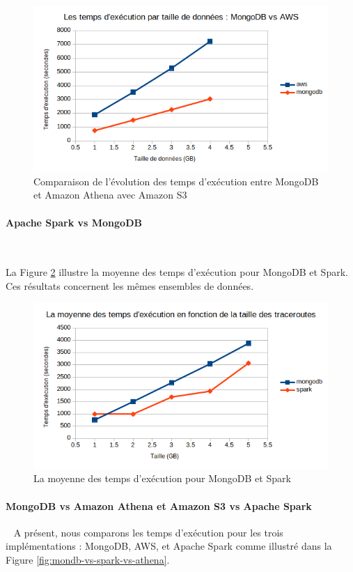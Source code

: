 \begin{figure}[H]
	\centering
	\captionsetup{justification=centering}
	\includegraphics[width=0.7\linewidth]{illustrations/mondb-vs-athena}
	\caption{Comparaison de l'évolution des temps d'exécution entre MongoDB et Amazon Athena avec Amazon S3}
	\label{fig:mondb-vs-athena}
\end{figure}

\paragraph{Apache Spark vs MongoDB}~

La Figure \ref{fig:mongodbvsspark} illustre la moyenne des temps d'exécution pour MongoDB et Spark. Ces résultats concernent les mêmes ensembles de données.

\begin{figure}[H]
	\centering
	\includegraphics[width=0.7\linewidth]{testPerformances/mongodbvsspark}
	\caption{La moyenne des temps d'exécution pour MongoDB et Spark}
	\label{fig:mongodbvsspark}
\end{figure}

\paragraph{MongoDB vs Amazon Athena et Amazon S3 vs Apache Spark }~
A présent, nous comparons les temps d'exécution pour les trois implémentations : MongoDB, AWS, et Apache Spark comme illustré dans la Figure 	\ref{fig:mondb-vs-spark-vs-athena}. 

